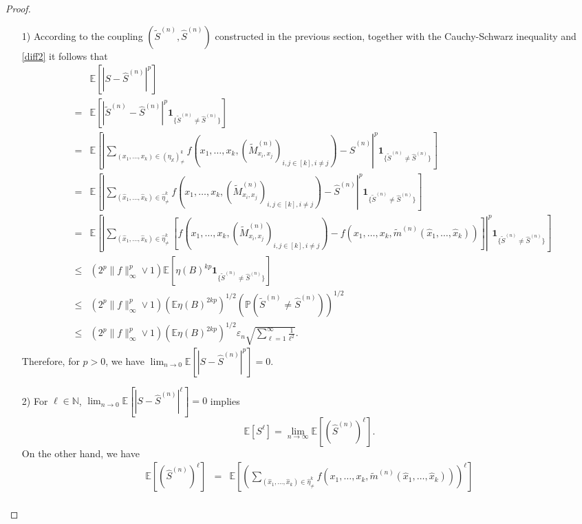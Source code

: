 \documentclass{article}
\theoremstyle{definition}
\numberwithin{equation}{section}
\theoremstyle{remark}
\newcommand{\E}{\mathbb{E}}
\newcommand{\IP}{\mathbb{P}}
\newcommand{\N}{\mathbb{N}}
\begin{document}
\begin{proof}
\begin{enumerate}
        \item[1)] 
According to the coupling $(\widetilde{S}^{(n)},\widehat{S}^{(n)})$ constructed in the previous section, together with the Cauchy-Schwarz inequality and \eqref{diff2} it follows that 
\begin{eqnarray*}
    &&\E\left[\left|S-\widehat{S}^{(n)}\right|^p\right]\\
    &=&\E\left[\left|\widetilde{S}^{(n)}-\widehat{S}^{(n)}\right|^p\mathbf{1}_{\{\widetilde{S}^{(n)}\ne\widehat{S}^{(n)}\}}\right]\\
    &=&\E\left[\left|\sum_{(x_1,\ldots,x_k)\in(\eta_{\mathbb{X}})^k_{\neq}} f(x_1,\ldots,x_k, (\widetilde{M}^{(n)}_{x_i,x_j})_{i,j\in[k],i\neq j})-\widehat{S}^{(n)}\right|^p\mathbf{1}_{\{\widetilde{S}^{(n)}\ne\widehat{S}^{(n)}\}}\right]\\
    &=&\E\left[\left|\sum_{(\hat{x}_1,\ldots,\hat{x}_k)\in\widehat{\eta}^k_{\neq}} f(x_1,\ldots,x_k, (\widetilde{M}^{(n)}_{x_i,x_j})_{i,j\in[k],i\neq j})-\widehat{S}^{(n)}\right|^p\mathbf{1}_{\{\widetilde{S}^{(n)}\ne\widehat{S}^{(n)}\}}\right]\\
    &=&\E\left[\left|\sum_{(\hat{x}_1,\ldots,\hat{x}_k)\in\widehat{\eta}^k_{\neq}} \left[f(x_1,\ldots,x_k, (\widetilde{M}^{(n)}_{x_i,x_j})_{i,j\in[k],i\neq j})-f(x_1,\ldots,x_k, \tilde{m}^{(n)}(\hat{x}_1,\ldots,\hat{x}_k))\right]\right|^p\mathbf{1}_{\{\widetilde{S}^{(n)}\ne\widehat{S}^{(n)}\}}\right]\\
    &\le&(2^p\|f\|_{\infty}^p\vee 1)\E\left[\eta(B)^{kp}\mathbf{1}_{\{\widetilde{S}^{(n)}\ne\widehat{S}^{(n)}\}}\right]\\
    &\le&(2^p\|f\|_{\infty}^p\vee 1)\left(\E\eta(B)^{2kp}\right)^{1/2}\left(\IP(\widetilde{S}^{(n)}\ne\widehat{S}^{(n)})\right)^{1/2}\\
    &\le&(2^p\|f\|_{\infty}^p\vee 1)\left(\E\eta(B)^{2kp}\right)^{1/2}\varepsilon_n \sqrt{\sum_{\ell=1}^\infty \frac{1}{\ell^2} }.
\end{eqnarray*}
Therefore, for $p>0$, we have $\lim_{n\to0}\E\left[\left|S-\widehat{S}^{(n)}\right|^p\right]=0$.
\item[2)]
For $\ell\in\N$, $\lim_{n\to0}\E\left[\left|S-\widehat{S}^{(n)}\right|^{\ell}\right]=0$ implies $$\E\left[S^{\ell}\right]=\lim_{n\to\infty}\E\left[(\widehat{S}^{(n)})^{\ell}\right].$$ On the other hand, we have 
\begin{eqnarray*}
\E\left[(\widehat{S}^{(n)})^{\ell}\right]&=&\E\left[\left(\sum_{(\hat{x}_1,\ldots,\hat{x}_k)\in\widehat{\eta}^k_{\neq}} f(x_1,\ldots,x_k, \tilde{m}^{(n)}(\hat{x}_1,\ldots,\hat{x}_k))\right)^{\ell}\right]\\

\end{eqnarray*}
\end{enumerate}
\end{proof}
\end{document}
